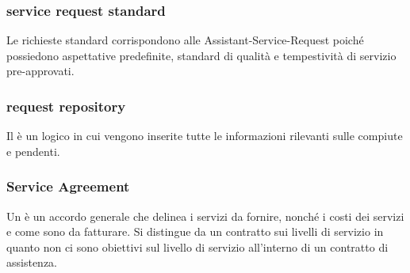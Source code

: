 \subsubsection{service request standard}
Le richieste standard corrispondono alle \ac{Assistant-Service-Request} poiché possiedono aspettative predefinite, standard di qualità e tempestività di servizio pre-approvati.

\subsubsection{request repository}
Il  è un  logico in cui vengono inserite tutte le informazioni rilevanti sulle  compiute e pendenti.

\subsubsection{Service Agreement}
Un  è un accordo generale che delinea i servizi da fornire, nonché i costi dei servizi e come sono da fatturare. Si distingue da un contratto sui livelli di servizio in quanto non ci sono obiettivi sul livello di servizio all'interno di un contratto di assistenza.